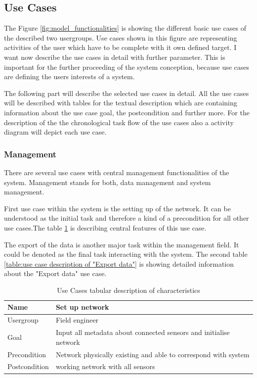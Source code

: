 \subsection{Use Cases}
The Figure \ref{fig:model_functionalities} is showing the different basic use cases of the described two usergroups. Use cases shown in this figure are representing activities of the user which have to be complete with it own defined target. I want now describe the use cases in detail with further parameter. This is important for the further proceeding of the system conception, because use cases are defining the users interests of a system.

The following part will describe the selected use cases in detail. All the use cases will be described with tables for the textual description which are containing information about the use case goal, the postcondition and further more. For the description of the the chronological task flow of the use cases also a activity diagram will depict each use case.


\subsubsection{Management}
There are several use cases with central management functionalities of the system. Management stands for both, data management and system management.  

First use case within the system is the setting up of the network. It can be understood as the initial task and therefore a kind of a precondition for all other use cases.The table \ref{table:use case description of "Set up network"} is describing central features of this use case. 

The export of the data is another major task within the management field. It could be denoted as the final task interacting with the system. The second table \ref{table:use case description of "Export data"} is showing detailed information about the "Export data" use case.

\begin{table}[H]
\centering
\begin{tabular}{l | p{11cm}}
Name & Set up network\\ \hline 
Usergroup & Field engineer\\ \hline 
Goal & Input all metadata about connected sensors and initialise network\\ \hline 
Precondition & Network physically existing and able to correspond with system\\ \hline 
Postcondition & working network with all sensors\\ 
\end{tabular}
\caption{Use Cases tabular description of characteristics} 
\label{table:use case description of "Set up network"}
\end{table}

